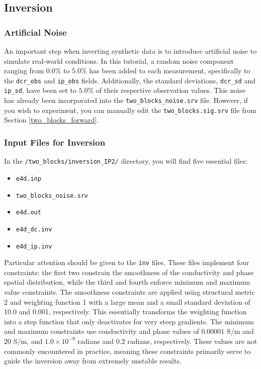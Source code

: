 \documentclass[a4paper,12pt]{article}
\begin{document}
\subsection{Inversion}

\subsubsection{Artificial Noise}

An important step when inverting synthetic data is to introduce artificial
noise to simulate real-world conditions. In this tutorial, a random noise
component ranging from $0.0\%$ to $5.0\%$ has been added to each measurement,
specifically to the \texttt{dcr\_obs} and \texttt{ip\_obs} fields.
Additionally, the standard deviations, \texttt{dcr\_sd} and \texttt{ip\_sd},
have been set to $5.0\%$ of their respective observation values. This noise has
already been incorporated into the \texttt{two\_blocks\_noise.srv} file.
However, if you wish to experiment, you can manually edit the
\texttt{two\_blocks.sig.srv} file from Section \ref{two_blocks_forward}.

\subsubsection{Input Files for Inversion}

In the \texttt{/two\_blocks/inversion\_IP2/} directory, you will find five
essential files:

\begin{itemize}
    \item \texttt{e4d.inp}
    \item \texttt{two\_blocks\_noise.srv}
    \item \texttt{e4d.out}
    \item \texttt{e4d\_dc.inv}
    \item \texttt{e4d\_ip.inv}
\end{itemize}

Particular attention should be given to the \texttt{inv} files. These files
implement four constraints: the first two constrain the smoothness of the
conductivity and phase spatial distribution, while the third and fourth enforce
minimum and maximum value constraints. The smoothness constraints are applied
using structural metric 2 and weighting function 1 with a large mean and a
small standard deviation of 10.0 and 0.001, respectively. This essentially
transforms the weighting function into a step function that only deactivates
for very steep gradients. The minimum and maximum constraints use conductivity
and phase values of \(0.00001\) S/m and \(20\) S/m, and \(1.0 \times 10^{-9}\)
radians and \(0.2\) radians, respectively. These values are not commonly
encountered in practice, meaning these constraints primarily serve to guide the
inversion away from extremely unstable results.
\end{document}
